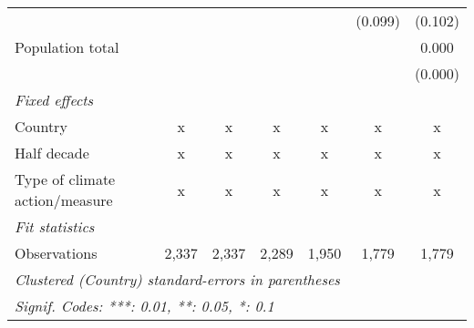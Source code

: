 \begin{tabular}{lcccccc}
                                          &         &             &         &         & (0.099)      & (0.102)\\   
   Population total                       &         &             &         &         &              & 0.000\\   
                                          &         &             &         &         &              & (0.000)\\   
   \emph{Fixed effects}\\
   Country                                & x       & x           & x       & x       & x            & x\\  
   Half decade                            & x       & x           & x       & x       & x            & x\\  
   Type of climate action/measure         & x       & x           & x       & x       & x            & x\\  
   \midrule \emph{Fit statistics}\\
   Observations                           & 2,337   & 2,337       & 2,289   & 1,950   & 1,779        & 1,779\\  
   \midrule
   \multicolumn{7}{l}{\emph{Clustered (Country) standard-errors in parentheses}}\\
   \multicolumn{7}{l}{\emph{Signif. Codes: ***: 0.01, **: 0.05, *: 0.1}}\\
\end{tabular}
\par\endgroup


